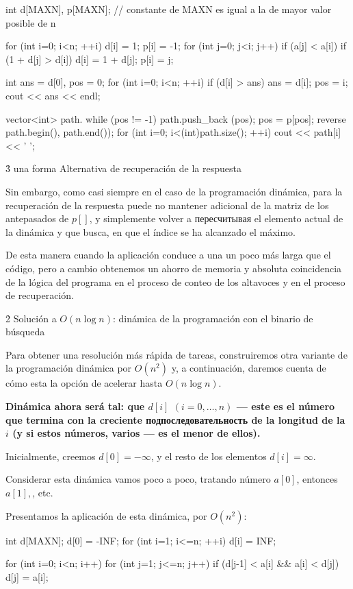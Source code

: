 \code
int d[MAXN], p[MAXN]; // constante de MAXN es igual a la de mayor valor posible de n

for (int i=0; i<n; ++i) {
d[i] = 1;
p[i] = -1;
for (int j=0; j<i; j++)
if (a[j] < a[i])
if (1 + d[j] > d[i]) {
d[i] = 1 + d[j];
p[i] = j;
}
}

int ans = d[0], pos = 0;
for (int i=0; i<n; ++i)
if (d[i] > ans) {
ans = d[i];
pos = i;
}
cout << ans << endl;

vector<int> path.
while (pos != -1) {
path.push_back (pos);
pos = p[pos];
}
reverse path.begin(), path.end());
for (int i=0; i<(int)path.size(); ++i)
cout << path[i] << ' ';
\endcode


\h3{ una forma Alternativa de recuperación de la respuesta }

Sin embargo, como casi siempre en el caso de la programación dinámica, para la recuperación de la respuesta puede no mantener adicional de la matriz de los antepasados de $p[]$, y simplemente volver a пересчитывая el elemento actual de la dinámica y que busca, en que el índice se ha alcanzado el máximo.

De esta manera cuando la aplicación conduce a una un poco más larga que el código, pero a cambio obtenemos un ahorro de memoria y absoluta coincidencia de la lógica del programa en el proceso de conteo de los altavoces y en el proceso de recuperación.



\h2{ Solución a $O (n \log n)$: dinámica de la programación con el binario de búsqueda }

Para obtener una resolución más rápida de tareas, construiremos otra variante de la programación dinámica por $O (n^2)$ y, a continuación, daremos cuenta de cómo esta la opción de acelerar hasta $O (n \log n)$.

\bf{Dinámica} ahora será tal: que $d[i]$ $(i = 0, \ldots, n)$ --- este es el número que termina con la creciente подпоследовательность de la longitud de la $i$ (y si estos números, varios --- es el menor de ellos).

Inicialmente, creemos $d[0] = -\infty$, y el resto de los elementos $d[i] = \infty$.

Considerar esta dinámica vamos poco a poco, tratando número $a[0]$, entonces $a[1],$, etc.

Presentamos la aplicación de esta dinámica, por $O (n^2)$:

\code
int d[MAXN];
d[0] = -INF;
for (int i=1; i<=n; ++i)
d[i] = INF;

for (int i=0; i<n; i++)
for (int j=1; j<=n; j++)
if (d[j-1] < a[i] && a[i] < d[j])
d[j] = a[i];
\endcode

